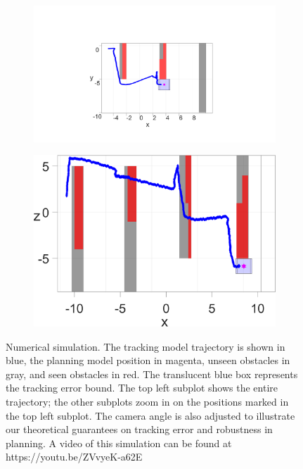\begin{figure}
	\begin{subfigure}[t]{0.49\columnwidth} \label{subfig:sim_2}
		\includegraphics[width=\columnwidth]{fig/763}
		\caption{}
	\end{subfigure}  
	\begin{subfigure}[t]{0.49\columnwidth} \label{subfig:sim_3}
		\includegraphics[width=\columnwidth]{fig/1042}
		\caption{}
	\end{subfigure}
	\vspace{-.1in}
	\caption{Numerical simulation. The tracking model trajectory is shown in blue, the planning model position in magenta, unseen obstacles in gray, and seen obstacles in red. The translucent blue box represents the tracking error bound. The top left subplot shows the entire trajectory; the other subplots zoom in on the positions marked in the top left subplot. The camera angle is also adjusted to illustrate our theoretical guarantees on tracking error and robustness in planning. A video of this simulation can be found at https://youtu.be/ZVvyeK-a62E \label{fig:sim}}
	\vspace{-.2in}
\end{figure}


